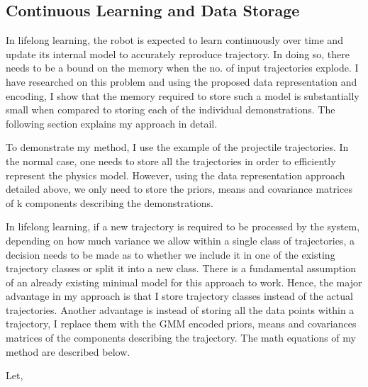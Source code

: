 \documentclass[conference]{IEEEtran}
\begin{document}
\subsection{Continuous Learning and Data Storage}
In lifelong learning, the robot is expected to learn continuously over time and update its internal model to accurately reproduce trajectory. In doing so, there needs to be a bound on the memory when the no. of input trajectories explode. I have researched on this problem and using the proposed data representation and encoding, I show that the memory required to store such a model is substantially small when compared to storing each of the individual demonstrations. The following section explains my approach in detail. 

To demonstrate my method, I use the example of the projectile trajectories. In the normal case, one needs to store all the trajectories in order to efficiently represent the physics model. However, using the data representation approach detailed above, we only need to store the priors, means and covariance matrices of k components describing the demonstrations. 

In lifelong learning, if a new trajectory is required to be processed by the system, depending on how much variance we allow within a single class of trajectories, a decision needs to be made as to whether we include it in one of the existing trajectory classes or split it into a new class. There is a fundamental assumption of an already existing minimal model for this approach to work. Hence, the major advantage in my approach is that I store trajectory classes instead of the actual trajectories. Another advantage is instead of storing all the data points within a trajectory, I replace them with the GMM encoded priors, means and covariances matrices of the components describing the trajectory. The math equations of my method are described below.

Let,
\end{document}
